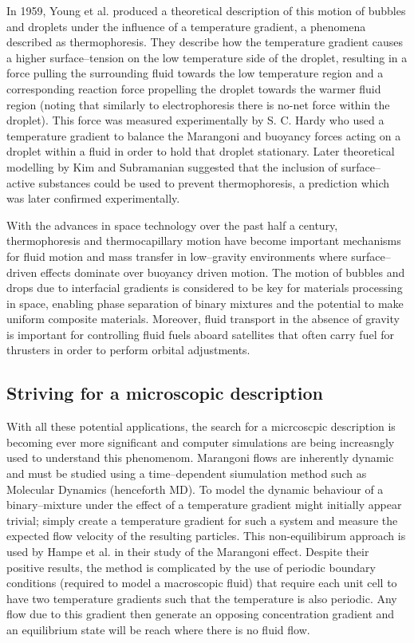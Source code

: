 In 1959, Young et al. produced a theoretical description of this motion of bubbles and droplets under the influence of a temperature gradient, a phenomena described as thermophoresis.\cite{Young1959}
They describe how the temperature gradient causes a higher surface--tension on the low temperature side of the droplet, resulting in a force pulling the surrounding fluid towards the low temperature region and a corresponding reaction force propelling the droplet towards the warmer fluid region (noting that similarly to electrophoresis there is no-net force within the droplet).
This force was measured experimentally by S. C. Hardy\cite{Hardy1978} who used a temperature gradient to balance the Marangoni and buoyancy forces acting on a droplet within a fluid in order to hold that droplet stationary.
Later theoretical modelling by Kim and Subramanian suggested that the inclusion of surface--active substances could be used to prevent thermophoresis,\cite{KimSubramanianA,KimSubramanianB} a prediction which was later confirmed experimentally.\cite{BartonSubramanian,ChenStebe}

With the advances in space technology over the past half a century, thermophoresis and thermocapillary motion have become important mechanisms for fluid motion and mass transfer in low--gravity environments where surface--driven effects dominate over buoyancy driven motion.
The motion of bubbles and drops due to interfacial gradients is considered to be key for materials processing in space, enabling phase separation of binary mixtures and the potential to make uniform composite materials.\cite{BartonSubramanian}
Moreover, fluid transport in the absence of gravity is important for controlling fluid fuels aboard satellites that often carry fuel for thrusters in order to perform orbital adjustments.\cite{MotionOfBubblesAndDrops} 

\subsection{Striving for a microscopic description}
With all these potential applications, the search for a micrcoscpic description is becoming ever more significant and computer simulations are being increasngly used to understand this phenomenom.
Marangoni flows are inherently dynamic and must be studied using a time--dependent siumulation method such as Molecular Dynamics (henceforth MD).
To model the dynamic behaviour of a binary--mixture under the effect of a temperature gradient might initially appear trivial; simply create a temperature gradient for such a system and measure the expected flow velocity of the resulting particles.
This non-equilibirum approach is used by Hampe et al. in their study of the Marangoni effect.\cite{HolgerBoppHampe}
Despite their positive results, the method is complicated by the use of periodic boundary conditions (required to model a macroscopic fluid) that require each unit cell to have two temperature gradients such that the temperature is also periodic.
Any flow due to this gradient then generate an opposing concentration gradient and an equilibrium state will be reach where there is no fluid flow.


